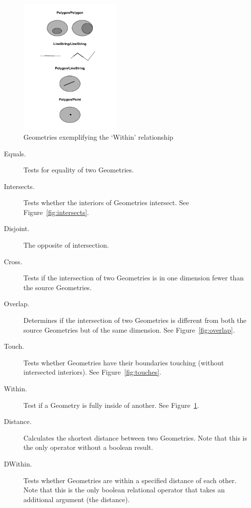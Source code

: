\begin{figure}
    \centering

    \includegraphics[width=0.45\textwidth]{figures/within.png}
    
    \caption{Geometries exemplifying the `Within' relationship}
    \label{fig:within}
    
\end{figure}

\begin{description}
  \item[Equals.] Tests for equality of two Geometries.
  \item[Intersects.] Tests whether the interiors of Geometries intersect. See Figure~\ref{fig:intersects}.
  \item[Disjoint.] The opposite of intersection.
  \item[Cross.] Tests if the intersection of two Geometries is in one dimension fewer than the source Geometries.
  \item[Overlap.] Determines if the intersection of two Geometries is different from both the source Geometries but of the same dimension. See Figure~\ref{fig:overlap}.
  \item[Touch.] Tests whether Geometries have their boundaries touching (without intersected interiors). See Figure~\ref{fig:touches}.
  \item[Within.] Test if a Geometry is fully inside of another. See Figure~\ref{fig:within}.
  \item[Distance.] Calculates the shortest distance between two Geometries. Note that this is the only operator without a boolean result.
  \item[DWithin.] Tests whether Geometries are within a specified distance of each other. Note that this is the only boolean relational operator that takes an additional argument (the distance).
\end{description}

